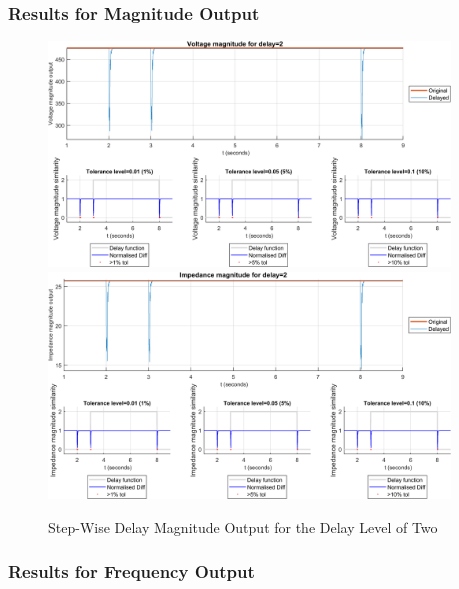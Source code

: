 \subsubsection{Results for Magnitude Output}

\begin{figure}
    \caption{Step-Wise Delay Magnitude Output for the Delay Level of Two}
    \includegraphics[width=0.95\textwidth]{PMUsim-figures/DelayOf_2/Step_vMagnitude.png}    
      \includegraphics[width=0.95\textwidth]{PMUsim-figures/DelayOf_2/Step_iMagnitude.png}    
    \label{fig:PMUsimStep_Two_Magnitude}
    \begin{small}
     \end{small}
\end{figure}

\newpage \subsubsection{Results for Frequency Output}


